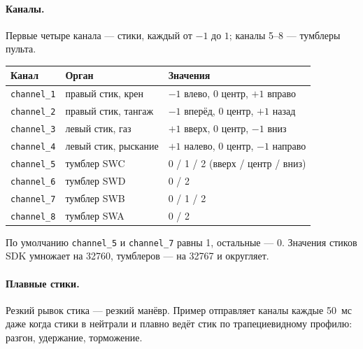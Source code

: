 \paragraph{Каналы.} Первые четыре канала --- стики, каждый от $-1$ до $1$; каналы 5--8 --- тумблеры пульта.

\begin{center}
\small
\begin{tabularx}{\linewidth}{@{}l l X@{}}
\toprule
\textbf{Канал} & \textbf{Орган} & \textbf{Значения} \\
\midrule
\verb|channel_1| & правый стик, крен & $-1$ влево, 0 центр, $+1$ вправо \\
\verb|channel_2| & правый стик, тангаж & $-1$ вперёд, 0 центр, $+1$ назад \\
\verb|channel_3| & левый стик, газ & $+1$ вверх, 0 центр, $-1$ вниз \\
\verb|channel_4| & левый стик, рыскание & $+1$ налево, 0 центр, $-1$ направо \\
\verb|channel_5| & тумблер SWC & 0 / 1 / 2 (вверх / центр / вниз) \\
\verb|channel_6| & тумблер SWD & 0 / 2 \\
\verb|channel_7| & тумблер SWB & 0 / 1 / 2 \\
\verb|channel_8| & тумблер SWA & 0 / 2 \\
\bottomrule
\end{tabularx}
\end{center}

По умолчанию \verb|channel_5| и \verb|channel_7| равны 1, остальные --- 0. Значения стиков SDK умножает на 32760, тумблеров --- на 32767 и округляет.

\paragraph{Плавные стики.} Резкий рывок стика --- резкий манёвр. Пример отправляет каналы каждые 50~мс даже когда стики в нейтрали и плавно ведёт стик по трапециевидному профилю: разгон, удержание, торможение.

\begin{center}
\end{center}

